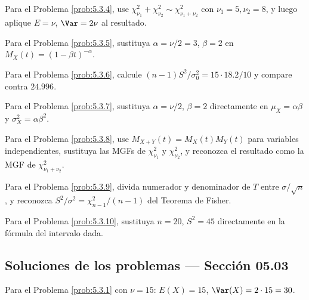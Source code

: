 \begin{sugerencia}
	\label{sug:5.3.4}
	Para el Problema \ref{prob:5.3.4}, use $\chi^2_{\nu_1}+\chi^2_{\nu_2}\sim\chi^2_{\nu_1+\nu_2}$ con $\nu_1=5,\nu_2=8$, y luego aplique $E=\nu$, $\Var=2\nu$ al resultado.
\end{sugerencia}

\begin{sugerencia}
	\label{sug:5.3.5}
	Para el Problema \ref{prob:5.3.5}, sustituya $\alpha=\nu/2=3$, $\beta=2$ en $M_X(t)=(1-\beta t)^{-\alpha}$.
\end{sugerencia}

\begin{sugerencia}
	\label{sug:5.3.6}
	Para el Problema \ref{prob:5.3.6}, calcule $(n-1)S^2/\sigma_0^2 = 15\cdot 18.2/10$ y compare contra $24.996$.
\end{sugerencia}

\begin{sugerencia}
	\label{sug:5.3.7}
	Para el Problema \ref{prob:5.3.7}, sustituya $\alpha=\nu/2$, $\beta=2$ directamente en $\mu_X=\alpha\beta$ y $\sigma_X^2=\alpha\beta^2$.
\end{sugerencia}

\begin{sugerencia}
	\label{sug:5.3.8}
	Para el Problema \ref{prob:5.3.8}, use $M_{X+Y}(t)=M_X(t)M_Y(t)$ para variables independientes, sustituya las MGFs de $\chi^2_{\nu_1}$ y $\chi^2_{\nu_2}$, y reconozca el resultado como la MGF de $\chi^2_{\nu_1+\nu_2}$.
\end{sugerencia}

\begin{sugerencia}
	\label{sug:5.3.9}
	Para el Problema \ref{prob:5.3.9}, divida numerador y denominador de $T$ entre $\sigma/\sqrt n$, y reconozca $S^2/\sigma^2 = \chi^2_{n-1}/(n-1)$ del Teorema de Fisher.
\end{sugerencia}

\begin{sugerencia}
	\label{sug:5.3.10}
	Para el Problema \ref{prob:5.3.10}, sustituya $n=20$, $S^2=45$ directamente en la fórmula del intervalo dada.
\end{sugerencia}

\subsection*{Soluciones de los problemas --- Sección 05.03}

\begin{solucion}
	\label{sol:5.3.1}
	Para el Problema \ref{prob:5.3.1} con $\nu=15$: $E(X)=15$, $\Var(X)=2\cdot 15=30$. \quad \qedhere
\end{solucion}

